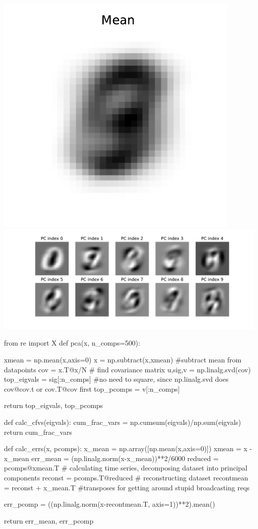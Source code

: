 \documentclass[submit]{harvardml}
\begin{document}
\includegraphics[width=0.25\linewidth]{p2_mean}
\includegraphics[width=0.75\linewidth]{p2_pcomps}



\begin{python}
from re import X
def pca(x, n_comps=500):
    
    xmean = np.mean(x,axis=0)
    x = np.subtract(x,xmean) #subtract mean from datapoints
    cov = x.T@x/N # find covariance matrix
    u,sig,v = np.linalg.svd(cov)
    top_eigvals = sig[:n_comps] #no need to square, since np.linalg.svd does cov@cov.t or cov.T@cov first
    top_pcomps = v[:n_comps] 



    return top_eigvals, top_pcomps


def calc_cfvs(eigvals):
    cum_frac_vars = np.cumsum(eigvals)/np.sum(eigvals)
    return cum_frac_vars


def calc_errs(x, pcomps):
    x_mean = np.array([np.mean(x,axis=0)])
    xmean = x - x_mean
    err_mean = (np.linalg.norm(x-x_mean))**2/6000
    reduced = pcomps@xmean.T # calculating time series, decomposing dataset into principal components
    reconst = pcomps.T@reduced # reconstructing dataset
    recontmean = reconst + x_mean.T #transposes for getting around stupid broadcasting reqs


    err_pcomp = ((np.linalg.norm(x-recontmean.T, axis=1))**2).mean()


    return err_mean, err_pcomp
\end{python}
\end{document}
